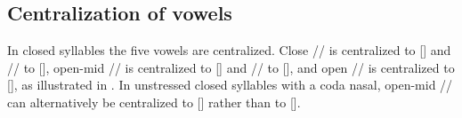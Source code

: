 \newpage 
\subsection{Centralization of vowels\label{Para_2.2.3}}
In closed syllables the five vowels are centralized. Close // is centralized to [] and // to [], open-mid // is centralized to [] and // to [], and open // is centralized to [], as illustrated in . In unstressed closed syllables with a coda nasal, open-mid // can alternatively be centralized to [] rather than to [].

